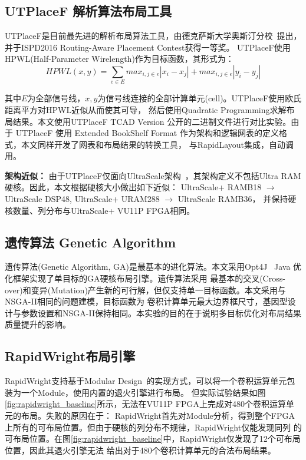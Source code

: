 \subsection{UTPlaceF 解析算法布局工具}

UTPlaceF是目前最先进的解析布局算法工具，由德克萨斯大学奥斯汀分校~\cite{li2017utplacef}提出，并于ISPD2016 Routing-Aware Placement Contest获得一等奖。
UTPlaceF使用HPWL(Half-Parameter Wirelength)作为目标函数，其形式为：
\begin{equation}
 HPWL(x,y) = \sum_{e \in E} {max_{i,j \in e} |x_i-x_j| + max_{i,j \in e} |y_i-y_j|} 
\end{equation}

其中$E$为全部信号线，$x, y$为信号线连接的全部计算单元(cell)。UTPlaceF使用欧氏距离平方对HPWL近似从而使其可导，
然后使用Quadratic Programming求解布局结果。本文使用UTPlaceF TCAD Version 公开的二进制文件进行对比实验。由于
UTPlaceF 使用 Extended BookShelf Format 作为架构和逻辑网表的定义格式，本文同样开发了网表和布局结果的转换工具，
与RapidLayout集成，自动调用。

{\bf 架构近似：} 由于UTPlaceF仅面向UltraScale架构~\cite{li2017utplacef}，其架构定义不包括Ultra RAM硬核。因此，本文根据硬核大小做出如下近似：
UltraScale+ RAMB18 $\rightarrow$ UltraScale DSP48, 
UltraScale+ URAM288 $\rightarrow$ UltraScale RAMB36，
并保持硬核数量、列分布与UltraScale+ VU11P FPGA相同。

\subsection{遗传算法 Genetic Algorithm}

遗传算法(Genetic Algorithm, GA)是最基本的进化算法。本文采用Opt4J~\cite{opt4jpaper} Java 优化框架实现了单目标的GA硬核布局引擎。遗传算法采用
最基本的交叉(Cross-over)和变异(Mutation)产生新的可行解，但仅支持单一目标函数。本文采用与NSGA-II相同的问题建模，目标函数为
卷积计算单元最大边界框尺寸，基因型设计与参数设置和NSGA-II保持相同。本实验的目的在于说明多目标优化对布局结果质量提升的影响。

\subsection{RapidWright布局引擎}

RapidWright支持基于Modular Design~\cite{lavin2018rapidwright}的实现方式，可以将一个卷积运算单元包装为一个Module，使用内置的退火引擎进行布局。
但实际试验结果如图\ref{fig:rapidwright_baseline}所示，无法在VU11P FPGA上完成对480个卷积运算单元的布局。失败的原因在于：
RapidWright首先对Module分析，得到整个FPGA上所有的可布局位置。但由于硬核的列分布不规律，RapidWright仅能发现同列
的可布局位置。在图\ref{fig:rapidwright_baseline}中，RapidWright仅发现了12个可布局位置，因此其退火引擎无法
给出对于480个卷积计算单元的合法布局结果。


